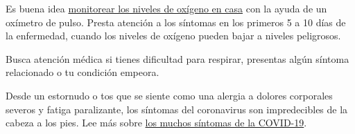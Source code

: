 Es buena idea
\href{https://www.nytimes3xbfgragh.onion/es/2020/04/29/espanol/estilos-de-vida/oximetro-para-que-sirve.html}{monitorear
los niveles de oxígeno en casa} con la ayuda de un oxímetro de pulso.
Presta atención a los síntomas en los primeros 5 a 10 días de la
enfermedad, cuando los niveles de oxígeno pueden bajar a niveles
peligrosos.

Busca atención médica si tienes dificultad para respirar, presentas
algún síntoma relacionado o tu condición empeora.

Desde un estornudo o tos que se siente como una alergia a dolores
corporales severos y fatiga paralizante, los síntomas del coronavirus
son impredecibles de la cabeza a los pies. Lee más sobre
\href{https://www.nytimes3xbfgragh.onion/2020/08/05/well/live/coronavirus-covid-symptoms.html}{los
muchos síntomas de la COVID-19}.

